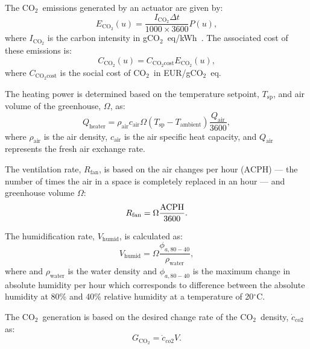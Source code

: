 \documentclass[conference]{IEEEtran}
\newcommand{\coo}{\ensuremath{\mathrm{CO_2}}}
\begin{document}
The \coo\ emissions generated by an actuator are given by:
\begin{equation}
    E_{\coo}(u) = \frac{I_{\coo}  \Delta t}{1000 \times 3600}  P(u),
\end{equation}
where \( I_{\coo} \) is the carbon intensity in g\coo\ eq/kWh~\cite{ElectricityMaps2022}. The associated cost of these emissions is:
\begin{equation}
    C_{\coo}(u) = C_{\coo\text{cost}}  E_{\coo}(u),
\end{equation}
where \( C_{\coo\text{cost}} \) is the social cost of \coo\ in EUR/g\coo\ eq.

The heating power is determined based on the temperature setpoint, \( T_{\text{sp}} \), and air volume of the greenhouse, \( \Omega \), as:
\begin{equation}
    Q_{\text{heater}} = \rho_{\text{air}}  c_{\text{air}}  \Omega  (T_{\text{sp}} - T_{\text{ambient}})  \frac{Q_{\text{air}}}{3600},
\end{equation}
where \( \rho_{\text{air}} \) is the air density, \( c_{\text{air}} \) is the air specific heat capacity, and \( Q_{\text{air}} \) represents the fresh air exchange rate.

The ventilation rate, \( R_{\text{fan}} \), is based on the air changes per hour (\( \text{ACPH} \)) --- the number of times the air in a space is completely replaced in an hour --- and greenhouse volume \( \Omega \):
\begin{equation}
    R_{\text{fan}} = \Omega \frac{\text{\( \text{ACPH} \)}}{3600}.
\end{equation}

The humidification rate, \( V_{\text{humid}} \), is calculated as:
\begin{equation}
    V_{\text{humid}} = \Omega \frac{\phi_{a, 80 - 40}}{\rho_{\text{water}}},
\end{equation}
where and \( \rho_{\text{water}} \) is the water density and  \( \phi_{a, 80 - 40} \) is the maximum change in absolute humidity per hour which corresponds to difference between the absolute humidity at 80\% and 40\% relative humidity at a temperature of 20\( ^\circ \)C.

The \coo\ generation is based on the desired change rate of the \coo\ density, \( \dot{c}_{co2} \) as:
\begin{equation}
    G_{\coo} = \dot{c}_{co2}  V.
\end{equation}
\end{document}
